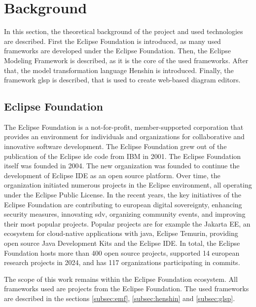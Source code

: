 \chapter{Background}
\label{sec:background}
  In this section, the theoretical background of the project and used technologies are described. First the Eclipse Foundation is introduced, as many used frameworks are developed under the Eclipse Foundation. Then, the Eclipse Modeling Framework is described, as it is the core of the used frameworks. After that, the model transformation language Henshin is introduced. Finally, the framework \ac{glsp} is described, that is used to create web-based diagram editors.

  \section{Eclipse Foundation}
  \label{subsec:eclipse-foundation}
  The Eclipse Foundation is a not-for-profit, member-supported corporation that provides an environment for individuals and organizations for collaborative and innovative software development. \cite{eclipse-review} The Eclipse Foundation grew out of the publication of the Eclipse \ac{ide} code from IBM in 2001. The Eclipse Foundation itself was founded in 2004. The new organization was founded to continue the development of Eclipse IDE as an open source platform. Over time, the organization initiated numerous projects in the Eclipse environment, all operating under the Eclipse Public License. \cite{heise-eclipse-foundation,eclipse-review} In the recent years, the key initiatives of the Eclipse Foundation are contributing to european digital sovereignty, enhancing security measures, innovating \ac{sdv}, organizing community events, and improving their most popular projects. Popular projects are for example the Jakarta EE, an ecosystem for cloud-native applications with java, Eclipse Temurin, providing open source Java Development Kits and the Eclipse IDE. \cite{eclipse-report} In total, the Eclipse Foundation hosts more than 400 open source projects, supported 14 european research projects in 2024, and has 117 organizations participating in commits. \cite{eclipse-report}

  The scope of this work remains within the Eclipse Foundation ecosystem. All frameworks used are projects from the Eclipse Foundation. The used frameworks are described in the sections \ref{subsec:emf}, \ref{subsec:henshin} and \ref{subsec:glsp}.

